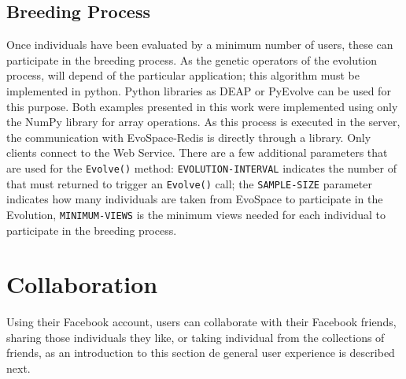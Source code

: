 \documentclass{sig-alternate}
\begin{document}
\subsection{Breeding Process}

Once individuals have been evaluated by a minimum number of users, these can participate in the breeding process. As the genetic operators of the evolution process, will depend of the particular application; this algorithm must be implemented in python. Python libraries as DEAP or PyEvolve can be used for this purpose. Both examples presented in this work were implemented using only the NumPy library for array operations. As this process is executed in the server, the communication with EvoSpace-Redis is directly through a library. Only clients connect to the Web Service. There are a few additional parameters that are used for the \texttt{Evolve()} method: \texttt{EVOLUTION-INTERVAL} indicates the number of that must returned to trigger an \texttt{Evolve()} call; the  \texttt{SAMPLE-SIZE} parameter indicates how many individuals are taken from EvoSpace to participate in the Evolution, \texttt{MINIMUM-VIEWS} is the minimum views needed for each individual to participate in the breeding process.

\section{Collaboration}
Using their Facebook account, users can collaborate with their Facebook friends, sharing those individuals they like, or taking individual from the collections of friends, as an introduction to this section de general user experience is described next.
\end{document}
